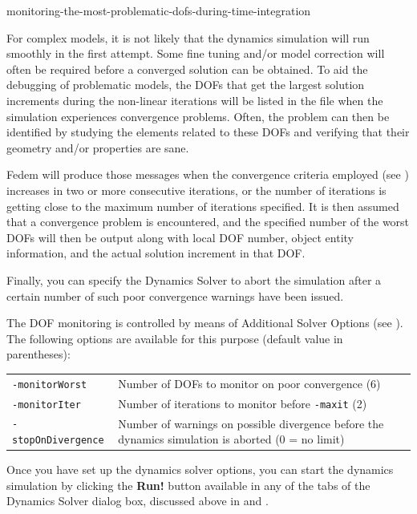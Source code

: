 {
           {monitoring-the-most-problematic-dofs-during-time-integration}

For complex models, it is not likely that the dynamics simulation will run
smoothly in the first attempt. Some fine tuning and/or model correction will
often be required before a converged solution can be obtained.
To aid the debugging of problematic models, the DOFs that get the largest
solution increments during the non-linear iterations will be listed in the
 file when the simulation experiences convergence problems.
Often, the problem can then be identified by studying the elements related
to these DOFs and verifying that their geometry and/or properties are sane.

Fedem will produce those messages when the convergence criteria employed (see
)
increases in two or more consecutive iterations, or the number of iterations is
getting close to the maximum number of iterations specified.
It is then assumed that a convergence problem is encountered, and the specified
number of the worst DOFs will then be output along with local DOF number,
object entity information, and the actual solution increment in that DOF.

Finally, you can specify the Dynamics Solver to abort the simulation
after a certain number of such poor convergence warnings have been issued.

The DOF monitoring is controlled by means of Additional Solver Options
(see ).
The following options are available for this purpose
(default value in parentheses):

\begin{tabular}{ m{3.0cm} m{8.0cm} }
{\tt-monitorWorst} & Number of DOFs to monitor on poor convergence (6) \\
{\tt-monitorIter} & Number of iterations to monitor before {\tt-maxit} (2) \\
{\tt-stopOnDivergence} & Number of warnings on possible divergence before the
                         dynamics simulation is aborted (0 = no limit)
\end{tabular}



Once you have set up the dynamics solver options, you can start the dynamics
simulation by clicking the \textbf{Run!} button available in any of the tabs
of the Dynamics Solver dialog box, discussed above in
 and
.


}
